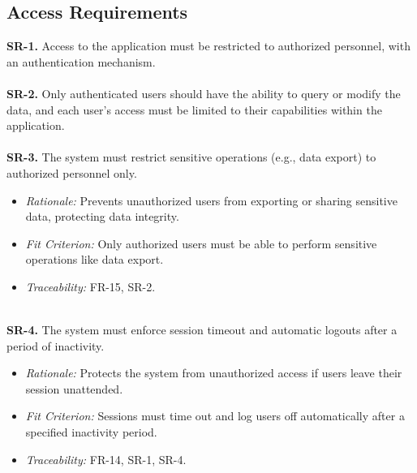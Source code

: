 \documentclass{article}
\begin{document}
\subsection{Access Requirements}
\textbf{SR-1.} Access to the application must be restricted to authorized
  personnel, with an authentication mechanism. \ \\
\ \\
\textbf{SR-2.} Only authenticated users should have the ability to query or
  modify the data, and each user’s access must be limited to their capabilities
  within the application. \ \\
  \ \\
\textbf{SR-3.} The system must restrict sensitive operations (e.g., data export)
  to authorized personnel only.
    \begin{itemize}
      \item \textit{Rationale:} Prevents unauthorized users from exporting or
      sharing sensitive data, protecting data integrity.
      \item \textit{Fit Criterion:} Only authorized users must be able to
      perform sensitive operations like data export.
      \item \textit{Traceability:} FR-15, SR-2.
    \end{itemize}
\ \\
\textbf{SR-4.} The system must enforce session timeout and automatic logouts
after a period of inactivity.
  \begin{itemize}
    \item \textit{Rationale:} Protects the system from unauthorized access if
    users leave their session unattended.
    \item \textit{Fit Criterion:} Sessions must time out and log users off
    automatically after a specified inactivity period.
    \item \textit{Traceability:} FR-14, SR-1, SR-4.
  \end{itemize}
\end{document}
